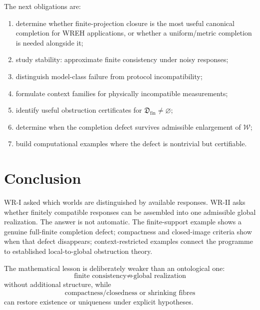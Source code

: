 \documentclass[11pt]{article}
\newcommand{\W}{\mathcal W}
\newcommand{\Dfin}{\mathfrak D_{\mathrm{fin}}}
\begin{document}
The next obligations are:
\begin{enumerate}
\item determine whether finite-projection closure is the most useful canonical
completion for WREH applications, or whether a uniform/metric completion is
needed alongside it;
\item study stability: approximate finite consistency under noisy responses;
\item distinguish model-class failure from protocol incompatibility;
\item formulate context families for physically incompatible measurements;
\item identify useful obstruction certificates for $\Dfin\neq\varnothing$;
\item determine when the completion defect survives admissible enlargement of
$\W$;
\item build computational examples where the defect is nontrivial but
certifiable.
\end{enumerate}

\section*{Conclusion}

WR-I asked which worlds are distinguished by available responses. WR-II asks
whether finitely compatible responses can be assembled into one admissible
global realization. The answer is not automatic. The finite-support example
shows a genuine full-finite completion defect; compactness and closed-image
criteria show when that defect disappears; context-restricted examples connect
the programme to established local-to-global obstruction theory.

The mathematical lesson is deliberately weaker than an ontological one:
\[
\text{finite consistency}
\not\Rightarrow
\text{global realization}
\]
without additional structure, while
\[
\text{compactness/closedness or shrinking fibres}
\]
can restore existence or uniqueness under explicit hypotheses.
\end{document}
